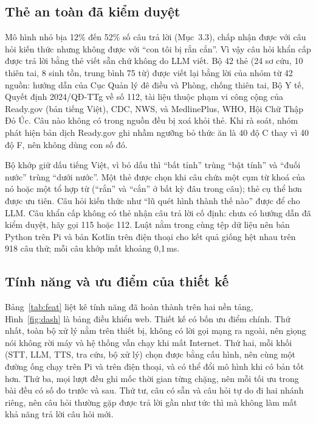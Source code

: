 \documentclass[a4paper,12pt,twocolumn]{article}
\begin{document}
\subsection{Thẻ an toàn đã kiểm duyệt}
Mô hình nhỏ bịa 12\% đến 52\% số câu trả lời (Mục~3.3), chấp nhận được với câu hỏi kiến thức nhưng không được với ``con tôi bị rắn cắn''. Vì vậy câu hỏi khẩn cấp được trả lời bằng thẻ viết sẵn chứ không do LLM viết. Bộ 42 thẻ (24 sơ cứu, 10 thiên tai, 8 sinh tồn, trung bình 75 từ) được viết lại bằng lời của nhóm từ 42 nguồn: hướng dẫn của Cục Quản lý đê điều và Phòng, chống thiên tai, Bộ Y tế, Quyết định 2024/QĐ-TTg về số 112, tài liệu thuộc phạm vi công cộng của Ready.gov (bản tiếng Việt), CDC, NWS, và MedlinePlus, WHO, Hội Chữ Thập Đỏ Úc. Câu nào không có trong nguồn đều bị xoá khỏi thẻ. Khi rà soát, nhóm phát hiện bản dịch Ready.gov ghi nhầm ngưỡng bỏ thức ăn là 40 độ C thay vì 40 độ F, nên không dùng con số đó.

Bộ khớp giữ dấu tiếng Việt, vì bỏ dấu thì ``bất tỉnh'' trùng ``bật tính'' và ``đuối nước'' trùng ``dưới nước''. Một thẻ được chọn khi câu chứa một cụm từ khoá của nó hoặc một tổ hợp từ (``rắn'' và ``cắn'' ở bất kỳ đâu trong câu); thẻ cụ thể hơn được ưu tiên. Câu hỏi kiến thức như ``lũ quét hình thành thế nào'' được để cho LLM. Câu khẩn cấp không có thẻ nhận câu trả lời cố định: chưa có hướng dẫn đã kiểm duyệt, hãy gọi 115 hoặc 112. Luật nằm trong cùng tệp dữ liệu nên bản Python trên Pi và bản Kotlin trên điện thoại cho kết quả giống hệt nhau trên 918 câu thử; mỗi câu khớp mất khoảng 0,1\,ms.

\subsection{Tính năng và ưu điểm của thiết kế}
Bảng~\ref{tab:feat} liệt kê tính năng đã hoàn thành trên hai nền tảng, Hình~\ref{fig:dash} là bảng điều khiển web. Thiết kế có bốn ưu điểm chính. Thứ nhất, toàn bộ xử lý nằm trên thiết bị, không có lời gọi mạng ra ngoài, nên giọng nói không rời máy và hệ thống vẫn chạy khi mất Internet. Thứ hai, mỗi khối (STT, LLM, TTS, tra cứu, bộ xử lý) chọn được bằng cấu hình, nên cùng một đường ống chạy trên Pi và trên điện thoại, và có thể đổi mô hình khi có bản tốt hơn. Thứ ba, mọi lượt đều ghi mốc thời gian từng chặng, nên mỗi tối ưu trong bài đều có số đo trước và sau. Thứ tư, câu có sẵn và câu hỏi tự do đi hai nhánh riêng, nên câu hỏi thường gặp được trả lời gần như tức thì mà không làm mất khả năng trả lời câu hỏi mới.
\end{document}

